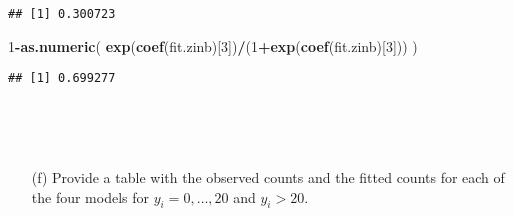 \documentclass[]{article}
\newenvironment{Shaded}{\begin{snugshade}}{\end{snugshade}}
\newcommand{\KeywordTok}[1]{\textcolor[rgb]{0.13,0.29,0.53}{\textbf{#1}}}
\newcommand{\DecValTok}[1]{\textcolor[rgb]{0.00,0.00,0.81}{#1}}
\newcommand{\OperatorTok}[1]{\textcolor[rgb]{0.81,0.36,0.00}{\textbf{#1}}}
\newcommand{\NormalTok}[1]{#1}
\begin{document}
\begin{verbatim}
## [1] 0.300723
\end{verbatim}

\begin{Shaded}
\begin{Highlighting}[]
\DecValTok{1}\OperatorTok{-}\KeywordTok{as.numeric}\NormalTok{( }\KeywordTok{exp}\NormalTok{(}\KeywordTok{coef}\NormalTok{(fit.zinb)[}\DecValTok{3}\NormalTok{])}\OperatorTok{/}\NormalTok{(}\DecValTok{1}\OperatorTok{+}\KeywordTok{exp}\NormalTok{(}\KeywordTok{coef}\NormalTok{(fit.zinb)[}\DecValTok{3}\NormalTok{])) )}
\end{Highlighting}
\end{Shaded}

\begin{verbatim}
## [1] 0.699277
\end{verbatim}

~

\begin{itemize}
     \item[] \vspace{1.5 in} 

 \end{itemize}

~

\begin{itemize}
\item[(f)] Provide a table with the observed counts and the fitted counts for each of the four models for $y_i=0, \ldots,20$ and $y_i > 20$.

 \end{itemize}
\end{document}
